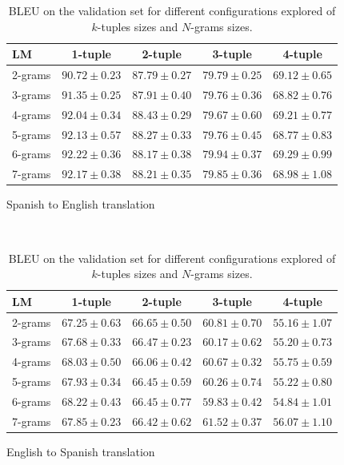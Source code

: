 \documentclass[10pt,a4paper]{article}
\begin{document}
\begin{table}[h]
\centering
\begin{subfigure}[b]{0.9\textwidth}
\centering
\begin{tabular}{|l|c|c|c|c|}
\hline
LM & 1-tuple & 2-tuple & 3-tuple & 4-tuple\\
\hline
2-grams & $90.72 \pm 0.23$ & $87.79 \pm 0.27$ & $79.79 \pm 0.25$ & $69.12 \pm 0.65$\\
3-grams & $91.35 \pm 0.25$ & $87.91 \pm 0.40$ & $79.76 \pm 0.36$ & $68.82 \pm 0.76$\\
4-grams & $92.04 \pm 0.34$ & $\mathbf{88.43 \pm 0.29}$ & $79.67 \pm 0.60$ & $69.21 \pm 0.77$\\
5-grams & $92.13 \pm 0.57$ & $88.27 \pm 0.33$ & $79.76 \pm 0.45$ & $68.77 \pm 0.83$\\
6-grams & $\mathbf{92.22 \pm 0.36}$ & $88.17 \pm 0.38$ & $\mathbf{79.94 \pm 0.37}$ & $\mathbf{69.29 \pm 0.99}$\\
7-grams & $92.17 \pm 0.38$ & $88.21 \pm 0.35$ & $79.85 \pm 0.36$ & $68.98 \pm 1.08$\\
\hline
\end{tabular}
\caption{Spanish to English translation}
\label{tab:tuples_valid_es_en}
\end{subfigure}\\

\begin{subfigure}[b]{0.9\textwidth}
\centering
\begin{tabular}{|l|c|c|c|c|}
\hline
LM & 1-tuple & 2-tuple & 3-tuple & 4-tuple\\
\hline
2-grams & $67.25 \pm 0.63$ & $\mathbf{66.65 \pm 0.50}$ & $60.81 \pm 0.70$ & $55.16 \pm 1.07$\\
3-grams & $67.68 \pm 0.33$ & $66.47 \pm 0.23$ & $60.17 \pm 0.62$ & $55.20 \pm 0.73$\\
4-grams & $68.03 \pm 0.50$ & $66.06 \pm 0.42$ & $60.67 \pm 0.32$ & $55.75 \pm 0.59$\\
5-grams & $67.93 \pm 0.34$ & $66.45 \pm 0.59$ & $60.26 \pm 0.74$ & $55.22 \pm 0.80$\\
6-grams & $\mathbf{68.22 \pm 0.43}$ & $66.45 \pm 0.77$ & $59.83 \pm 0.42$ & $54.84 \pm 1.01$\\
7-grams & $67.85 \pm 0.23$ & $66.42 \pm 0.62$ & $\mathbf{61.52 \pm 0.37}$ & $\mathbf{56.07 \pm 1.10}$\\
\hline
\end{tabular}
\caption{English to Spanish translation}
\label{tab:tuples_valid_en_es}
\end{subfigure}
\caption{BLEU on the validation set for different configurations explored of $k$-tuples  sizes and $N$-grams sizes.}
\label{tab:tuples_valid}
\end{table}
\end{document}
